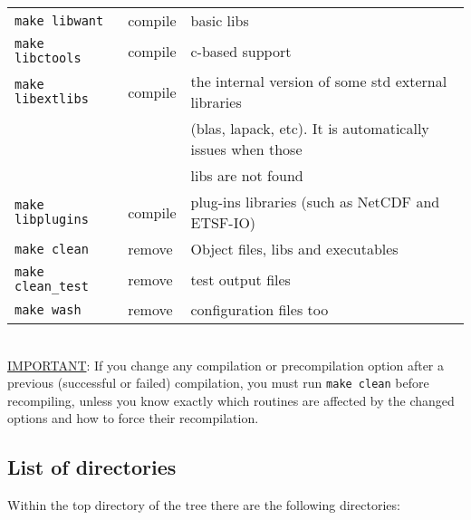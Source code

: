 \begin{tabular}{lll}
  \texttt{make libwant}    &  compile & \WANT{} basic libs       \\
  \texttt{make libctools}  &  compile & c-based support           \\
  \texttt{make libextlibs} &  compile & the internal version of some std external libraries         \\
                           &          & (blas, lapack, etc). It is automatically issues when those  \\
                           &          & libs are not found \\
  \texttt{make libplugins} &  compile & plug-ins libraries (such as NetCDF and ETSF-IO)  \\
  \texttt{make clean}      &  remove  & Object files, libs and executables     \\ 
  \texttt{make clean\_test}&  remove  & test output files     \\ 
  \texttt{make wash}       &  remove  & configuration files too   \\
\end{tabular}
%
%
\\[15pt]

\noindent \underline {IMPORTANT}: If you change any compilation or
precompilation option after a previous (successful or failed)
compilation, you must run \texttt{make clean} before recompiling,
unless you know exactly which routines are affected by the changed
options and how to force their recompilation.


\newpage
\subsection{List of directories}
Within the top directory of the \WANT{} tree there are the
following directories: \\

